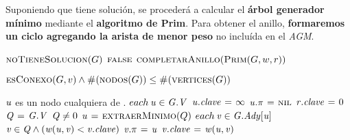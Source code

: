 Suponiendo que tiene solución, se procederá a calcular el \textbf{árbol 
generador mínimo} mediante el \textbf{algoritmo de Prim}. Para obtener el 
anillo, \textbf{formaremos un ciclo agregando la arista de menor peso} no 
incluída en el \textit{AGM}.


\begin{codebox}
\li \If $\textnormal{\scshape noTieneSolucion}(G)$
\li     \Then
            \Return $\textnormal{\scshape false}$
        \End
\li  \Return $\textnormal{\scshape completarAnillo}(\textnormal{\scshape Prim}(G,w,r))$
\end{codebox}


\vspace*{0.3cm}


\begin{codebox}
\li \Return $\textnormal{\scshape esConexo}(G,v) \land
    \textnormal{\scshape\#}(\textnormal{\scshape nodos}(G)) \leq 
    \textnormal{\scshape\#}(\textnormal{\scshape vertices}(G))$
\end{codebox}


\vspace*{0.3cm}


\begin{codebox}
\li \Comment $\id{u}$ es un nodo cualquiera de .
\li \For $each \hspace{0.07cm} \id{u} \in \id{G.V}$
\li     \Do
            $\id{u.clave} \gets \infty$
\li         $\id{u.\pi} \gets \const{nil}$
        \End
\li $\id{r.clave} \gets 0$
\li $\id{Q} \gets \id{G.V}$
\li \While $\id{Q} \neq 0$
\li     \Do
            $\id{u} \gets \proc{extraerMinimo}(Q)$
\li         \For $each \hspace{0.07cm} \id{v} \in \id{G.Ady[u]}$
                \Do
\li                 \If $\id{v} \in \id{Q} \land (\id{w(u,v)} < \id{v.clave})$
\li                     \Then
                            $\id{v.\pi} \gets \id{u}$
\li                         $\id{v.clave} \gets \id{w(u,v)}$
                        \End
                \End
        \End
\end{codebox}


\vspace*{0.3cm}


